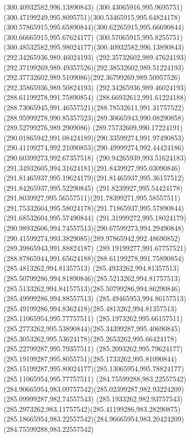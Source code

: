 {    \moveto(300.40932582,996.13890843)
    \curveto(300.43065916,995.9695751)(300.47199249,995.8095751)(300.53465915,995.64824178)
    \curveto(300.57865915,995.65890844)(300.62265915,995.66690844)(300.66665915,995.67624177)
    \curveto(300.57065915,995.8255751)(300.48532582,995.98024177)(300.40932582,996.13890843)
    \moveto(292.34265936,989.46024193)
    \curveto(292.35732602,989.47624193)(292.37199269,989.49357526)(292.38532602,989.51224193)
    \curveto(292.37732602,989.5109086)(292.36799269,989.50957526)(292.35865936,989.50824193)
    \lineto(292.34265936,989.46024193)
    \moveto(288.61199278,991.75890854)
    \curveto(288.66932612,991.61224188)(288.73065945,991.46557521)(288.78532611,991.31757522)
    \curveto(288.95999278,990.85357523)(289.30665943,990.08290858)(289.52799276,989.2909086)
    \curveto(289.75732609,990.17224191)(290.01865942,991.08424189)(290.33599274,991.97490853)
    \curveto(290.41199274,992.21090853)(290.49999274,992.44424186)(290.60399273,992.67357518)
    \curveto(290.94265939,993.51624183)(291.34932605,994.31624181)(291.8439927,995.03090846)
    \curveto(291.81465937,995.19624179)(291.81465937,995.36157512)(291.84265937,995.52290845)
    \curveto(291.8239927,995.54424178)(291.8039927,995.56557511)(291.78399271,995.58557511)
    \curveto(291.75332604,995.58024178)(291.71865937,995.57890844)(291.68532604,995.57490844)
    \curveto(291.31999272,995.18024179)(290.98932606,994.74557513)(290.67599273,994.29490848)
    \curveto(290.41599274,993.3829085)(289.97865942,992.48690852)(289.39865943,991.88824187)
    \curveto(289.19199277,991.67757521)(288.87865944,991.65624188)(288.61199278,991.75890854)
    \moveto(285.4813262,994.81357513)
    \curveto(285.4933262,994.81357513)(285.50799286,994.81890846)(285.5213262,994.81757513)
    \curveto(285.5133262,994.84157513)(285.50799286,994.86290846)(285.49999286,994.88557513)
    \curveto(285.49465953,994.86157513)(285.49199286,994.8362418)(285.4813262,994.81357513)
    \moveto(285.11065954,995.77757511)
    \curveto(285.1973262,995.66157511)(285.2773262,995.53890844)(285.34399287,995.40690845)
    \curveto(285.3053262,995.53624178)(285.2653262,995.66424178)(285.22799287,995.79357511)
    \curveto(285.2093262,995.79624177)(285.19199287,995.8055751)(285.1733262,995.81090844)
    \curveto(285.15199287,995.80024177)(285.13065954,995.78824177)(285.11065954,995.77757511)
    \moveto(284.75599288,983.22557542)
    \curveto(284.90665954,983.09757542)(285.02399287,982.93224209)(285.09999287,982.74557543)
    \curveto(285.1933262,982.93757543)(285.2973262,983.11757542)(285.41199286,983.28290875)
    \curveto(285.18665954,983.22557542)(284.96665954,983.20424209)(284.75599288,983.22557542)
}
